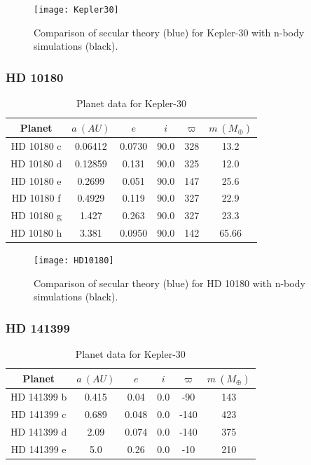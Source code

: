 \documentclass[11pt, oneside]{article}   	%
\begin{document}
\begin{figure}[!h]
\begin{center}
\texttt{[image: Kepler30]}
\caption[]{Comparison of secular theory (blue) for Kepler-30 with n-body simulations (black).}
\label{}
\end{center}
\end{figure}

\newpage

\subsubsection{HD 10180}

\begin{table}[!h]
\centering
\small
\label{my-label}
\begin{tabular}{|c|c|c|c|c|c|}
\hline
\rowcolor[HTML]{C0C0C0} 
Planet & $a \ (AU)$       & $e$     & $i$   & $\varpi$  & $m \ (M _{\oplus})$ \\ \hline
HD 10180 c    & 0.06412 & 0.0730 & 90.0 & 328 & 13.2  \\ \hline
HD 10180 d    & 0.12859 & 0.131  & 90.0 & 325 & 12.0  \\ \hline
HD 10180 e    & 0.2699  & 0.051  & 90.0 & 147 & 25.6  \\ \hline
HD 10180 f    & 0.4929  & 0.119  & 90.0 & 327 & 22.9  \\ \hline
HD 10180 g    & 1.427   & 0.263  & 90.0 & 327 & 23.3  \\ \hline
HD 10180 h    & 3.381   & 0.0950 & 90.0 & 142 & 65.66 \\ \hline
\end{tabular}
\caption{Planet data for Kepler-30}
\end{table}

\begin{figure}[!h]
\begin{center}
\texttt{[image: HD10180]}
\caption[]{Comparison of secular theory (blue) for HD 10180 with n-body simulations (black).}
\label{}
\end{center}
\end{figure}

\newpage

\subsubsection{HD 141399}

\begin{table}[!h]
\centering
\small
\label{my-label}
\begin{tabular}{|c|c|c|c|c|c|}
\hline
\rowcolor[HTML]{C0C0C0} 
Planet & $a \ (AU)$       & $e$     & $i$   & $\varpi$  & $m \ (M _{\oplus})$ \\ \hline
HD 141399 b    & 0.415 & 0.04  & 0.0 & -90  & 143  \\ \hline
HD 141399 c    & 0.689 & 0.048 & 0.0 & -140 & 423  \\ \hline
HD 141399 d    & 2.09  & 0.074 & 0.0 & -140 & 375  \\ \hline
HD 141399 e    & 5.0   & 0.26  & 0.0 & -10  & 210  \\ \hline
\end{tabular}
\caption{Planet data for Kepler-30}
\end{table}
\end{document}
